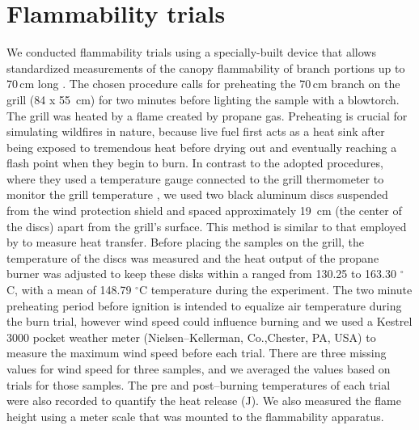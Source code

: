 \documentclass{bmcart}
\begin{document}
\section*{Flammability trials}

We conducted flammability trials using a specially-built device that allows standardized measurements of the canopy flammability of branch portions up to 70\,cm long \citep{jaureguiberry2011device}. The chosen procedure calls for preheating the 70\,cm branch on the grill (84 x 55 \,cm) for two minutes before lighting the sample with a blowtorch. The grill was heated by a flame created by propane gas. Preheating is crucial for simulating wildfires in nature, because live fuel first acts as a heat sink after being exposed to tremendous heat before drying out and eventually reaching a flash point when they begin to burn. In contrast to the adopted procedures, where they used a temperature gauge connected to the grill thermometer to monitor the grill temperature \citep{jaureguiberry2011device}, we used two black aluminum discs  suspended from the wind protection shield and spaced approximately 19 \,cm (the center of the discs) apart from the grill's surface. This method is similar to that employed by \citet{gao2022burn} to measure heat transfer. Before placing the samples on the grill, the temperature of the discs was measured and the heat output of the propane burner was adjusted to keep these disks within a ranged from 130.25 to 163.30 $^{\circ}$C, with a mean of 148.79 $^{\circ}$C temperature  during the experiment. The two minute preheating period before ignition is intended to equalize air temperature during the burn trial, however wind speed could influence burning and we used
a Kestrel 3000 pocket weather meter (Nielsen–Kellerman, Co.,Chester, PA, USA) to
measure the maximum wind speed before each trial. There are three missing values for wind speed for three samples, and we averaged the values based on trials for those samples. 
The pre and post--burning temperatures of each trial were also recorded to quantify the heat release (J). We also measured the flame height using a meter scale that was mounted to the flammability apparatus.
\end{document}
